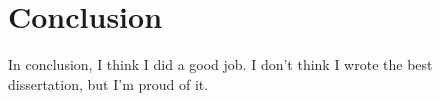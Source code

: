 \chapter{Conclusion}
In conclusion, I think I did a good job.
I don't think I wrote the best dissertation, but I'm proud of it.
